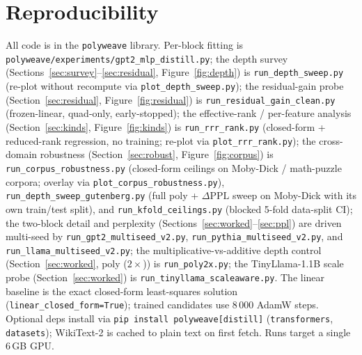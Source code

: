 \documentclass{article}
\newcommand{\dppl}{\Delta\mathrm{PPL}}
\begin{document}
\section{Reproducibility}
\label{sec:repro}

All code is in the \texttt{polyweave} library. Per-block fitting is
\texttt{polyweave/experiments/gpt2\_mlp\_distill.py}; the depth survey
(Sections~\ref{sec:survey}--\ref{sec:residual}, Figure~\ref{fig:depth}) is
\texttt{run\_depth\_sweep.py} (re-plot without recompute via \texttt{plot\_depth\_sweep.py}); the
residual-gain probe (Section~\ref{sec:residual}, Figure~\ref{fig:residual}) is
\texttt{run\_residual\_gain\_clean.py} (frozen-linear, quad-only, early-stopped); the effective-rank /
per-feature analysis (Section~\ref{sec:kinds}, Figure~\ref{fig:kinds}) is \texttt{run\_rrr\_rank.py}
(closed-form + reduced-rank regression, no training; re-plot via \texttt{plot\_rrr\_rank.py}); the
cross-domain robustness (Section~\ref{sec:robust}, Figure~\ref{fig:corpus}) is
\texttt{run\_corpus\_robustness.py} (closed-form ceilings on Moby-Dick / math-puzzle corpora; overlay
via \texttt{plot\_corpus\_robustness.py}), \texttt{run\_depth\_sweep\_gutenberg.py} (full poly +
$\dppl$ sweep on Moby-Dick with its own train/test split), and \texttt{run\_kfold\_ceilings.py}
(blocked 5-fold data-split CI); the two-block detail and perplexity
(Sections~\ref{sec:worked}--\ref{sec:ppl}) are driven multi-seed by
\texttt{run\_gpt2\_multiseed\_v2.py}, \texttt{run\_pythia\_multiseed\_v2.py}, and
\texttt{run\_llama\_multiseed\_v2.py}; the multiplicative-vs-additive depth control
(Section~\ref{sec:worked}, poly ($2\times$)) is \texttt{run\_poly2x.py}; the TinyLlama-1.1B scale
probe (Section~\ref{sec:worked}) is \texttt{run\_tinyllama\_scaleaware.py}. The linear baseline is the
exact closed-form least-squares solution (\texttt{linear\_closed\_form=True}); trained candidates use
8\,000 AdamW steps. Optional deps install via \texttt{pip install polyweave[distill]}
(\texttt{transformers}, \texttt{datasets}); WikiText-2 is cached to plain text on first fetch. Runs
target a single 6\,GB GPU.



\end{document}
